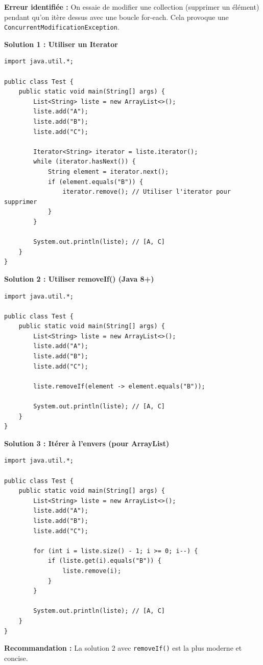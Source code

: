 \documentclass[11pt,a4paper]{article}
\begin{document}
\begin{correctionbox}
\textbf{Erreur identifiée :} On essaie de modifier une collection (supprimer un élément) pendant qu'on itère dessus avec une boucle for-each. Cela provoque une \texttt{ConcurrentModificationException}.

\textbf{Solution 1 : Utiliser un Iterator}

\begin{lstlisting}
import java.util.*;

public class Test {
    public static void main(String[] args) {
        List<String> liste = new ArrayList<>();
        liste.add("A");
        liste.add("B");
        liste.add("C");
        
        Iterator<String> iterator = liste.iterator();
        while (iterator.hasNext()) {
            String element = iterator.next();
            if (element.equals("B")) {
                iterator.remove(); // Utiliser l'iterator pour supprimer
            }
        }
        
        System.out.println(liste); // [A, C]
    }
}
\end{lstlisting}

\textbf{Solution 2 : Utiliser removeIf() (Java 8+)}

\begin{lstlisting}
import java.util.*;

public class Test {
    public static void main(String[] args) {
        List<String> liste = new ArrayList<>();
        liste.add("A");
        liste.add("B");
        liste.add("C");
        
        liste.removeIf(element -> element.equals("B"));
        
        System.out.println(liste); // [A, C]
    }
}
\end{lstlisting}

\textbf{Solution 3 : Itérer à l'envers (pour ArrayList)}

\begin{lstlisting}
import java.util.*;

public class Test {
    public static void main(String[] args) {
        List<String> liste = new ArrayList<>();
        liste.add("A");
        liste.add("B");
        liste.add("C");
        
        for (int i = liste.size() - 1; i >= 0; i--) {
            if (liste.get(i).equals("B")) {
                liste.remove(i);
            }
        }
        
        System.out.println(liste); // [A, C]
    }
}
\end{lstlisting}

\textbf{Recommandation :} La solution 2 avec \texttt{removeIf()} est la plus moderne et concise.
\end{correctionbox}
\end{document}
